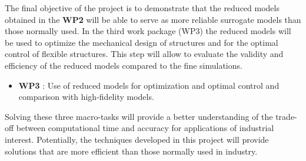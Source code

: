 \documentclass[12pt]{article}
\begin{document}
	The final objective of the project is to demonstrate that the reduced models obtained in the \textbf{WP2} will be able to serve as more reliable surrogate models than those normally used. In the third work package (WP3) the reduced models will be used to optimize the mechanical design of structures and for the optimal control of flexible structures. This step will allow to evaluate the validity and efficiency of the reduced models compared to the fine simulations. \\
	
	\begin{itemize}
		\item \textbf{WP3} : Use of reduced models for optimization and optimal control and comparison with high-fidelity models. \\
	\end{itemize}
	
	Solving these three macro-tasks will provide a better understanding of the trade-off between computational time and accuracy for applications of industrial interest. Potentially, the techniques developed in this project will provide solutions that are more efficient than those normally used in industry. 
	
	
	
	
	
	
\end{document}
